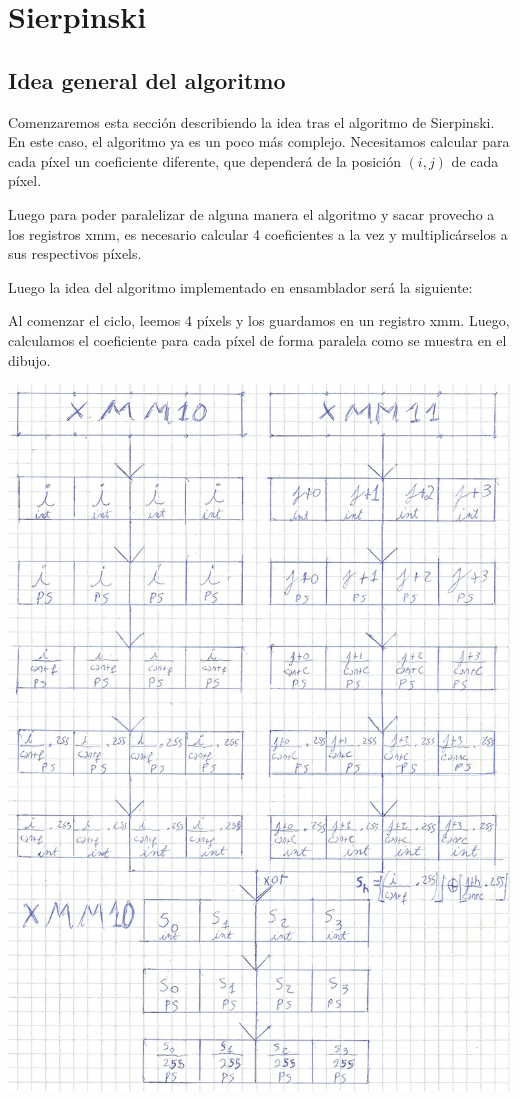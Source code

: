 \documentclass[a4paper]{article}
\begin{document}
\newpage
\section{Sierpinski}

\subsection{Idea general del algoritmo}

Comenzaremos esta sección describiendo la idea tras el algoritmo de Sierpinski. En este caso, el algoritmo ya es un poco más complejo. Necesitamos calcular para cada píxel un coeficiente diferente, que dependerá de la posición $(i,j)$ de cada píxel.

Luego para poder paralelizar de alguna manera el algoritmo y sacar provecho a los registros xmm, es necesario calcular 4 coeficientes a la vez y multiplicárselos a sus respectivos píxels.

Luego la idea del algoritmo implementado en ensamblador será la siguiente:

Al comenzar el ciclo, leemos 4 píxels y los guardamos en un registro xmm. Luego, calculamos el coeficiente para cada píxel de forma paralela como se muestra en el dibujo.

\begin{center}
\includegraphics[scale=0.75]{Dibujos/S1.jpg}
\end{center}
\end{document}
